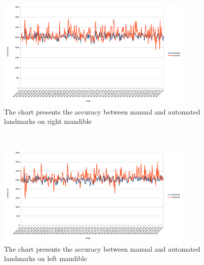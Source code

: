 \begin{figure}[h!]
\centering
\includegraphics[width=0.85\textwidth]{./images/MdChart}
\caption{The chart presents the accuracy between manual and automated landmarks on right mandible}
\label{figMdChart}
\end{figure}~\\
\begin{figure}[h!]
\centering
\includegraphics[width=0.85\textwidth]{./images/MgChart}
\caption{The chart presents the accuracy between manual and automated landmarks on left mandible}
\label{figMgChart}
\end{figure}~\\